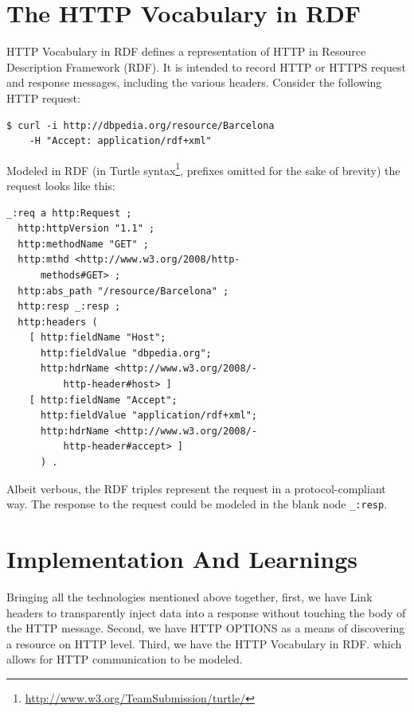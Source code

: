 \documentclass{acm_proc_article-sp}
\begin{document}
\section{The HTTP Vocabulary in RDF}\label{sec:httpvocab}
HTTP Vocabulary in RDF\cite{HTTP:RDF} defines a representation of HTTP in Resource Description Framework (RDF)\cite{W3C:RDF}. It is intended to record HTTP or HTTPS request and response messages, including the various headers. Consider the following HTTP request:
\begin{verbatim}
$ curl -i http://dbpedia.org/resource/Barcelona
    -H "Accept: application/rdf+xml"
\end{verbatim}
Modeled in RDF (in Turtle syntax\footnote{\url{http://www.w3.org/TeamSubmission/turtle/}}, prefixes omitted for the sake of brevity) the request looks like this:
\begin{verbatim}
_:req a http:Request ;
  http:httpVersion "1.1" ;
  http:methodName "GET" ;
  http:mthd <http://www.w3.org/2008/http-
      methods#GET> ;
  http:abs_path "/resource/Barcelona" ;
  http:resp _:resp ;
  http:headers (
    [ http:fieldName "Host";
      http:fieldValue "dbpedia.org";
      http:hdrName <http://www.w3.org/2008/-
          http-header#host> ]
    [ http:fieldName "Accept";
      http:fieldValue "application/rdf+xml";
      http:hdrName <http://www.w3.org/2008/-
          http-header#accept> ]
      ) .
\end{verbatim}
Albeit verbous, the RDF triples represent the request in a protocol-compliant way. The response to the request could be modeled in the blank node \texttt{\_:resp}.

\section{Implementation And Learnings}\label{sec:implementation}
Bringing all the technologies mentioned above together, first, we have Link headers to transparently inject data into a response without touching the body of the HTTP message. Second, we have HTTP OPTIONS as a means of discovering a resource on HTTP level. Third, we have the HTTP Vocabulary in RDF. which allows for HTTP communication to be modeled.
\end{document}
